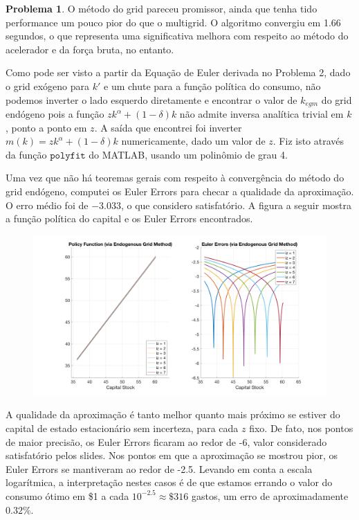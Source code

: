 \documentclass[11pt]{article}
\theoremstyle{definition}
\theoremstyle{definition}
\newtheorem{problema}{Problema}
\theoremstyle{solution}
\begin{document}
\begin{problema}
	O método do grid pareceu promissor, ainda que tenha tido performance um pouco pior do que o multigrid. O algoritmo convergiu em 1.66 segundos, o que representa uma significativa melhora com respeito ao método do acelerador e da força bruta, no entanto.
	
	Como pode ser visto a partir da Equação de Euler derivada no Problema 2, dado o grid exógeno para $k'$ e um chute para a função política do consumo, não podemos inverter o lado esquerdo diretamente e encontrar o valor de $k_{egm}$ do grid endógeno pois a função $zk^{\alpha} + (1-\delta)k$ não admite inversa analítica trivial em $k$, ponto a ponto em $z$. A saída que encontrei foi inverter $m(k) =  zk^{\alpha} + (1-\delta)k$ numericamente, dado um valor de $z$. Fiz isto através da função $\texttt{polyfit}$ do MATLAB, usando um polinômio de grau 4.
	
	Uma vez que não há teoremas gerais com respeito à convergência do método do grid endógeno, computei os Euler Errors para checar a qualidade da aproximação. O erro médio foi de $-3.033$, o que considero satisfatório. A figura a seguir mostra a função política do capital e os Euler Errors encontrados.
	\begin{figure}
		\centering
		\includegraphics[scale = 0.33]{EE.png}
	\end{figure}
	
	A qualidade da aproximação é tanto melhor quanto mais próximo se estiver do capital de estado estacionário sem incerteza, para cada $z$ fixo. De fato, nos pontos de maior precisão, os Euler Errors ficaram ao redor de -6, valor considerado satisfatório pelos slides. Nos pontos em que a aproximação se mostrou pior, os Euler Errors se mantiveram ao redor de -2.5. Levando em conta a escala logarítmica, a interpretação nestes casos é de que estamos errando o valor do consumo ótimo em \$1 a cada $10^{-2.5} \approx \$ 316$ gastos, um erro de aproximadamente $0.32\%$. 
\end{problema}
\end{document}
